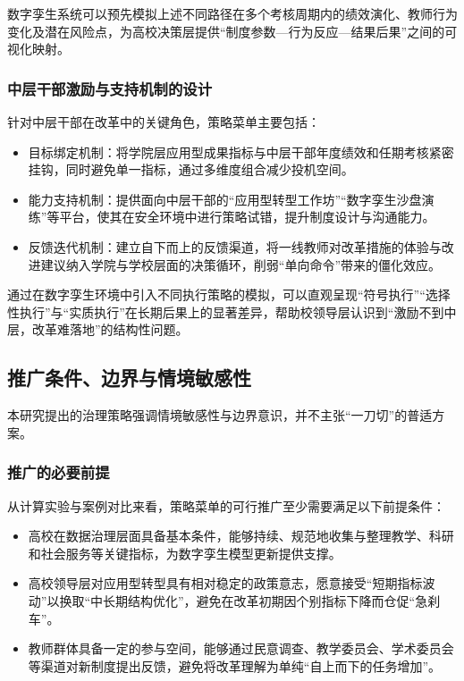 \documentclass[UTF8, zihao=-4, fontset=mac]{ctexart}
\begin{document}
数字孪生系统可以预先模拟上述不同路径在多个考核周期内的绩效演化、教师行为变化及潜在风险点，为高校决策层提供“制度参数—行为反应—结果后果”之间的可视化映射。

\subsubsection{中层干部激励与支持机制的设计}

针对中层干部在改革中的关键角色，策略菜单主要包括：

\begin{itemize}
    \item 目标绑定机制：将学院层应用型成果指标与中层干部年度绩效和任期考核紧密挂钩，同时避免单一指标，通过多维度组合减少投机空间。
    \item 能力支持机制：提供面向中层干部的“应用型转型工作坊”“数字孪生沙盘演练”等平台，使其在安全环境中进行策略试错，提升制度设计与沟通能力。
    \item 反馈迭代机制：建立自下而上的反馈渠道，将一线教师对改革措施的体验与改进建议纳入学院与学校层面的决策循环，削弱“单向命令”带来的僵化效应。
\end{itemize}

通过在数字孪生环境中引入不同执行策略的模拟，可以直观呈现“符号执行”“选择性执行”与“实质执行”在长期后果上的显著差异，帮助校领导层认识到“激励不到中层，改革难落地”的结构性问题。

\subsection{推广条件、边界与情境敏感性}

本研究提出的治理策略强调情境敏感性与边界意识，并不主张“一刀切”的普适方案。

\subsubsection{推广的必要前提}

从计算实验与案例对比来看，策略菜单的可行推广至少需要满足以下前提条件：

\begin{itemize}
    \item 高校在数据治理层面具备基本条件，能够持续、规范地收集与整理教学、科研和社会服务等关键指标，为数字孪生模型更新提供支撑。
    \item 高校领导层对应用型转型具有相对稳定的政策意志，愿意接受“短期指标波动”以换取“中长期结构优化”，避免在改革初期因个别指标下降而仓促“急刹车”。
    \item 教师群体具备一定的参与空间，能够通过民意调查、教学委员会、学术委员会等渠道对新制度提出反馈，避免将改革理解为单纯“自上而下的任务增加”。
\end{itemize}
\end{document}
